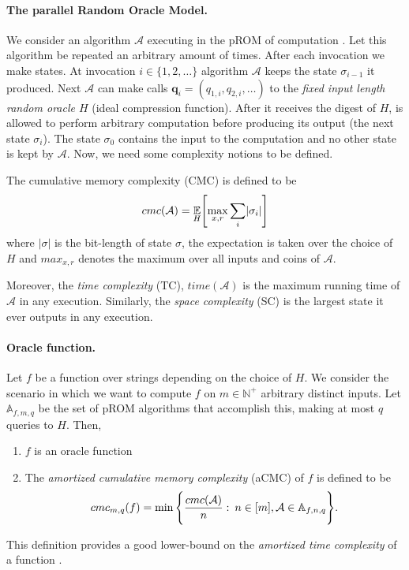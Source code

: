 \paragraph{The parallel Random Oracle Model.} We consider an algorithm $\mathcal{A}$ executing in the pROM of computation \cite{Alwen:2015:HPC:2746539.2746622}. Let this algorithm be repeated an arbitrary amount of times. After each invocation we make states. At invocation $i \in \{ 1,2, \dots \}$ algorithm $\mathcal{A}$ keeps the state $\sigma_{i-1}$ it produced. Next $\mathcal{A}$ can make calls $\textbf{q}_i = (q_{1,i}, q_{2,i}, \dots)$
to the \textit{fixed input length random oracle $H$} (ideal compression function). After it receives the digest of $H$, is allowed to perform arbitrary computation before producing its output (the next state $\sigma_i$). The state $\sigma_0$ contains the input to the computation and no other state is kept by $\mathcal{A}$. Now, we need some complexity notions to be defined.

The cumulative memory complexity (CMC) is defined to be
\begin{equation}
    cmc(\mathcal{A}) = \underset{H}{\mathbb{E}} \Bigg{[} \underset{x,r}{\max} \sum_{i} \lvert \sigma_i \rvert \Bigg{]}
\end{equation}
where $\lvert \sigma \rvert$ is the bit-length of state $\sigma$, the expectation is taken over the choice of $H$ and $max_{x,r}$ denotes the maximum over all inputs and coins of $\mathcal{A}$.

Moreover, the \textit{time complexity} (TC), $time(\mathcal{A})$ is the maximum running time of $\mathcal{A}$ in any execution. Similarly, the \textit{space complexity} (SC) is the largest state it ever outputs in any execution.

\paragraph{Oracle function.} Let $f$ be a function over strings depending on the choice of $H$. We consider the scenario in which we want to compute $f$ on $m \in \mathbb{N}^{+}$ arbitrary distinct inputs.
Let $\mathbb{A}_{f,m,q}$ be the set of pROM algorithms that accomplish this, making at most $q$ queries to
$H$. Then,

\begin{enumerate}[label=(\alph*)]
  \item $f$ is an oracle function \\

  \item The \textit{amortized cumulative memory complexity} (aCMC) of $f$ is defined to be
  \begin{equation}
      cmc_{m,q}(f) = \min \Bigg{\{} \frac{cmc(\mathcal{A})}{n} : \: n \in [m], \mathcal{A} \in \mathbb{A}_{f,n,q} \Bigg{\}}.
  \end{equation}
\end{enumerate}
This definition provides a good lower-bound on the \textit{amortized time complexity} of a function \cite{Alwen:2015:HPC:2746539.2746622}.

